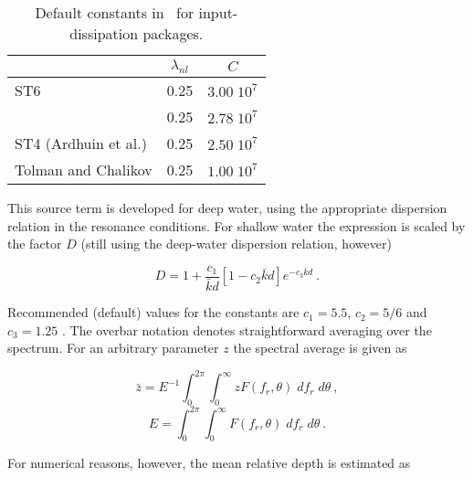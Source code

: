 \begin{table} \begin{center}
 \begin{tabular}{|l|c|c|} \hline
                    & $\lambda_{nl}$ &     $C$      \\ \hline
ST6                 &      0.25      & $3.00 \; 10^7$  \\ \hline
\wam-3              &      0.25      & $2.78 \; 10^7$  \\ \hline
ST4 (Ardhuin et al.)&      0.25      & $2.50 \; 10^7$  \\ \hline
Tolman and Chalikov &      0.25      & $1.00 \; 10^7$  \\ \hline
\end{tabular} \end{center}
\caption{Default constants in \dia\ for input-dissipation packages.}
\label{tab:snl_par} \botline \end{table}

This source term is developed for deep water, using the appropriate dispersion
relation in the resonance conditions. For shallow water the expression is
scaled by the factor $D$ (still using the deep-water dispersion relation,
however)


\begin{equation}
D = 1 + \frac{c_1}{\bar{k}d} \left [ 1 - c_2 \bar{k} d
\right ] e^{-c_3 \bar{k} d} \: . \label{eq:snl_shal}
\end{equation}

\noindent
Recommended (default) values for the constants are $c_1=5.5$, $c_2=5/6$ and
$c_3=1.25$ \citep{art:Hea85a}. The overbar notation denotes straightforward
averaging over the spectrum. For an arbitrary parameter $z$ the spectral average
is given as


\begin{equation}
\bar{z} = E^{-1} \int_{0}^{2\pi} \int_{0}^{\infty}
z F(f_r,\theta) \; d f_r \; d\theta \: , \label{eq:zbar}
\end{equation}
\begin{equation}
E = \int_{0}^{2\pi} \int_{0}^{\infty}
F(f_r,\theta) \; d f_r \; d\theta \: . \label{eq:etot}
\end{equation}

\noindent
For numerical reasons, however, the mean relative depth is estimated as

